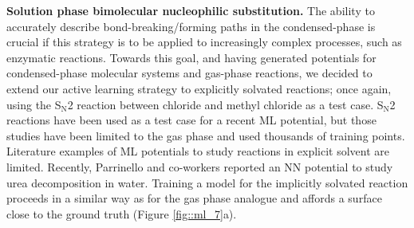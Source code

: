 \documentclass[../../main.tex]{subfiles}
\begin{document}
{\bfseries{Solution phase bimolecular nucleophilic substitution.}} The ability to accurately describe bond-breaking/forming paths in the condensed-phase is crucial if this strategy is to be applied to increasingly complex processes, such as enzymatic reactions. Towards this goal, and having generated potentials for condensed-phase molecular systems and gas-phase reactions, we decided to extend our active learning strategy to explicitly solvated reactions; once again, using the S${}_\text{N}$2 reaction between chloride and methyl chloride as a test case. S${}_\text{N}$2 reactions have been used as a test case for a recent ML potential, but those studies have been limited to the gas phase and used thousands of training points.\cite{Unke2019} Literature examples of ML potentials to study reactions in explicit solvent are limited. Recently, Parrinello and co-workers reported an NN potential to study urea decomposition in water.\cite{Yang2021} Training a model for the implicitly solvated reaction proceeds in a similar way as for the gas phase analogue and affords a surface close to the ground truth (Figure \ref{fig::ml_7}a).
\end{document}
